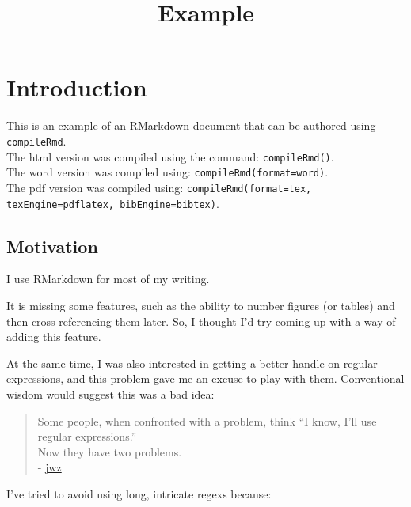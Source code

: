 \documentclass[]{article}
\title{Example}
\author{}
\date{}
\begin{document}
\maketitle


{
\hypersetup{linkcolor=black}
\setcounter{tocdepth}{2}
\tableofcontents
}
\listoffigures

\listoftables
\newpage

\section{Introduction}\label{introduction}

This is an example of an RMarkdown document that can be authored using
\texttt{compileRmd}.\\The html version was compiled using the command:
\texttt{compileRmd()}.\\The word version was compiled using:
\texttt{compileRmd(format=\textquotesingle{}word\textquotesingle{})}.\\The
pdf version was compiled using:
\texttt{compileRmd(format=\textquotesingle{}tex\textquotesingle{}, texEngine=\textquotesingle{}pdflatex\textquotesingle{}, bibEngine=\textquotesingle{}bibtex\textquotesingle{})}.

\subsection{Motivation}\label{motivation}

I use RMarkdown for most of my writing.

It is missing some features, such as the ability to number figures (or
tables) and then cross-referencing them later. So, I thought I'd try
coming up with a way of adding this feature.

At the same time, I was also interested in getting a better handle on
regular expressions, and this problem gave me an excuse to play with
them. Conventional wisdom would suggest this was a bad idea:

\begin{quote}
Some people, when confronted with a problem, think ``I know, I'll use
regular expressions.''\\Now they have two problems.\\-
\href{http://en.wikiquote.org/wiki/Jamie_Zawinski}{jwz}
\end{quote}

I've tried to avoid using long, intricate regexs because:
\end{document}
